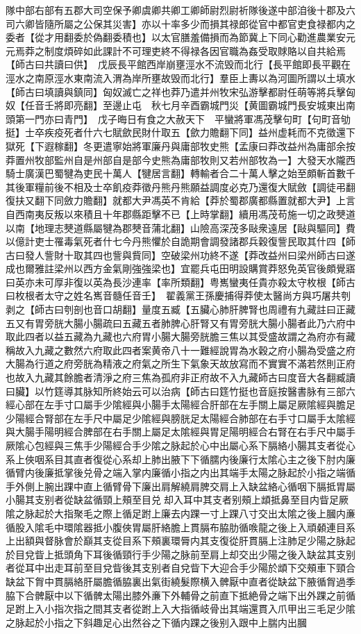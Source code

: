 隊中部右部有五郡大司空保予卿虞卿共卿工卿師尉烈尉祈隊後遂中部洎後十郡及六司六卿皆隨所屬之公保其災害】亦以十率多少而損其禄郎從官中都官吏食禄都内之委者【從才用翻委於偽翻委積也】以太官膳羞備損而為節冀上下同心勸進農業安元元焉莽之制度煩碎如此課計不可理吏終不得禄各因官職為姦受取賕賂以自共給焉【師古曰共讀曰供】　戊辰長平館西岸崩壅涇水不流毁而北行【長平館即長平觀在涇水之南原涇水東南流入渭為岸所壅故毁而北行】羣臣上夀以為河圖所謂以土填水【師古曰填讀與鎮同】匈奴滅亡之祥也莽乃遣并州牧宋弘游擊都尉任萌等將兵擊匈奴【任音壬將即亮翻】至邊止屯　秋七月辛酉霸城門災【黄圖霸城門長安城東出南頭第一門亦曰青門】　戊子晦日有食之大赦天下　平蠻將軍馮茂擊句町【句町音劬挺】士卒疾疫死者什六七賦歛民財什取五【歛力贍翻下同】益州虚耗而不克徵還下獄死【下遐稼翻】冬更遣寧始將軍廉丹與庸部牧史熊【孟康曰莽改益州為庸部余按莽置州牧部監州自是州部自是部今史熊為庸部牧則又若州部牧為一】大發天水隴西騎士廣漢巴蜀犍為吏民十萬人【犍居言翻】轉輸者合二十萬人擊之始至頗斬首數千其後軍糧前後不相及士卒飢疫莽徵丹熊丹熊願益調度必克乃還復大賦斂【調徒弔翻復扶又翻下同斂力贍翻】就都大尹馮英不肯給【莽於蜀郡廣都縣置就都大尹】上言自西南夷反叛以來積且十年郡縣距擊不已【上時掌翻】續用馮茂苟施一切之政僰道以南【地理志僰道縣屬犍為郡僰音蒲北翻】山險高深茂多敺衆遠居【敺與驅同】費以億計吏士罹毒氣死者什七今丹熊懼於自詭期會調發諸郡兵穀復訾民取其什四【師古曰發人訾財十取其四也訾與貲同】空破梁州功終不遂【莽改益州曰梁州師古曰遂成也爾雅註梁州以西方金氣剛強強梁也】宜罷兵屯田明設購賞莽怒免英官後頗覺寤曰英亦未可厚非復以英為長沙連率【率所類翻】粤嶲蠻夷任貴亦殺太守枚根【師古曰枚根者太守之姓名嶲音髓任音壬】　翟義黨王孫慶捕得莽使太醫尚方與巧屠共刳剥之【師古曰刳剖也音口胡翻】量度五臧【五臟心肺肝脾腎也周禮有九藏註曰正藏五又有胃旁胱大腸小腸疏曰五藏五者肺脾心肝腎又有胃旁胱大腸小腸者此乃六府中取此四者以益五藏為九藏也六府胃小腸大腸旁胱膽三焦以其受盛故謂之為府亦有藏稱故入九藏之數然六府取此四者案黄帝八十一難經說胃為水穀之府小腸為受盛之府大腸為行道之府旁胱為精液之府氣之所生下氣象天故放寫而不實實不滿若然則正府也故入九藏其餘膽者清淨之府三焦為孤府非正府故不入九藏師古曰度音大各翻臧讀曰臟】以竹筳導其脉知所終始云可以治病【師古曰筳竹挺也音庭按醫書脉有三部六經心部在左手寸口屬手少隂經與小腸手太陽經合肝部在左手關上屬足厥隂經與膽足少陽經合腎部在左手尺中屬足少隂經與膀胱足太陽經合肺部在右手寸口屬手太隂經與大腸手陽明經合脾部在右手關上屬足太隂經與胃足陽明經合右腎在右手尺中屬手厥隂心包經與三焦手少陽經合手少隂之脉起於心中出屬心系下膈絡小腸其支者從心系上俠咽系目其直者復從心系却上肺出腋下下循臑内後廉行太隂心主之後下肘内廉循臂内後廉抵掌後兑骨之端入掌内廉循小指之内出其端手太陽之脉起於小指之端循手外側上腕出踝中直上循臂骨下廉出肩解繞肩脾交肩上入缺盆絡心循咽下膈抵胃屬小腸其支别者從缺盆循頸上頰至目兑却入耳中其支者别頰上䪼抵鼻至目内眥足厥隂之脉起於大指聚毛之際上循足跗上廉去内踝一寸上踝八寸交出太隂之後上膕内亷循股入隂毛中環隂器抵小腹俠胃屬肝絡膽上貫膈布脇肋循㗋龍之後上入頑顙連目系上出額與督脉會於巔其支從目系下頰裏環脣内其支復從肝貫膈上注肺足少陽之脉起於目兌眥上抵頭角下耳後循頸行手少陽之脉前至肩上却交出少陽之後入缺盆其支别者從耳中出走耳前至目兌眥後其支别者自兌眥下大迎合手少陽於䪼下交頰車下頸合缺盆下胷中貫膈絡肝屬膽循脇裏出氣街繞髮際横入髀厭中直者從缺盆下腋循胷過季脇下合髀厭中以下循髀太陽出膝外亷下外輔骨之前直下抵絶骨之端下出外踝之前循足跗上入小指次指之間其支者從跗上入大指循岐骨出其端還貫入爪甲出三毛足少隂之脉起於小指之下斜趣足心出然谷之下循内踝之後别入跟中上腨内出膕